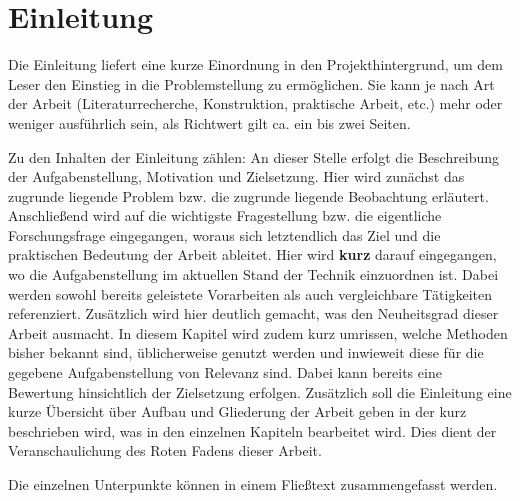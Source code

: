 \chapter{Einleitung}
\label{chap:Intro}
Die Einleitung liefert eine kurze Einordnung in den Projekthintergrund, um dem Leser den Einstieg in die Problemstellung zu ermöglichen. Sie kann je nach Art der Arbeit (Literaturrecherche, Konstruktion, praktische Arbeit, etc.) mehr oder weniger ausführlich sein, als Richtwert gilt ca. ein bis zwei Seiten.

Zu den Inhalten der Einleitung zählen:
%
An dieser Stelle erfolgt die Beschreibung der Aufgabenstellung, Motivation und Zielsetzung. Hier wird zunächst das zugrunde liegende Problem bzw. die zugrunde liegende Beobachtung erläutert. Anschließend wird auf die wichtigste Fragestellung bzw. die eigentliche Forschungsfrage eingegangen, woraus sich letztendlich das Ziel und die praktischen Bedeutung der Arbeit ableitet.
%
Hier wird \textbf{kurz} darauf eingegangen, wo die Aufgabenstellung im aktuellen Stand der Technik einzuordnen ist. Dabei werden sowohl bereits geleistete Vorarbeiten als auch vergleichbare Tätigkeiten referenziert. Zusätzlich wird hier deutlich gemacht, was den Neuheitsgrad dieser Arbeit ausmacht.
In diesem Kapitel wird zudem kurz umrissen, welche Methoden bisher bekannt sind, üblicherweise genutzt werden und inwieweit diese für die gegebene Aufgabenstellung von Relevanz sind. Dabei kann bereits eine Bewertung hinsichtlich der Zielsetzung erfolgen.
%
Zusätzlich soll die Einleitung eine kurze Übersicht über Aufbau und Gliederung der Arbeit geben in der kurz beschrieben wird, was in den einzelnen Kapiteln bearbeitet wird. Dies dient der Veranschaulichung des Roten Fadens dieser Arbeit.

Die einzelnen Unterpunkte können in einem Fließtext zusammengefasst werden.
